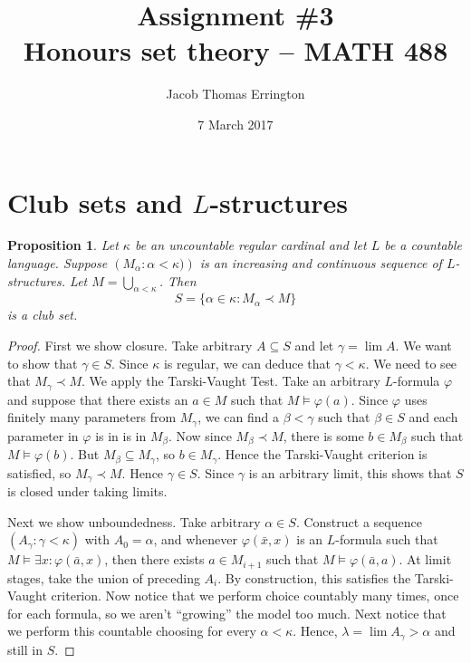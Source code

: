 \documentclass[11pt,letterpaper]{article}
\author{Jacob Thomas Errington}
\title{Assignment \#3 \\ Honours set theory -- MATH 488}
\date{7 March 2017}
\newtheorem{prop}{Proposition}
\newcommand{\parens}[1]{\left(#1\right)}
\newcommand{\Union}{\bigcup}
\newcommand{\question}{\section}
\renewcommand{\phi}{\varphi}
\begin{document}
\maketitle

\question{Club sets and $L$-structures}

\begin{prop}
    Let $\kappa$ be an uncountable regular cardinal and let $L$ be a countable
    language. Suppose $\parens{M_\alpha : \alpha < \kappa)}$ is an increasing
    and continuous sequence of $L$-structures.
    Let $M = \Union_{\alpha < \kappa}$.
    Then
    \begin{equation*}
        S = \{ \alpha \in \kappa : M_\alpha \prec M \}
    \end{equation*}
    is a club set.
\end{prop}

\begin{proof}
    First we show closure. Take arbitrary $A \subseteq S$ and let
    $\gamma = \lim A$. We want to show that $\gamma \in S$. Since $\kappa$ is
    regular, we can deduce that $\gamma < \kappa$. We need to see that
    $M_\gamma \prec M$. We apply the Tarski-Vaught Test. Take an arbitrary
    $L$-formula $\phi$ and suppose that there exists an $a \in M$ such that
    $M \models \phi(a)$. Since $\phi$ uses finitely many parameters from
    $M_\gamma$, we can find a $\beta < \gamma$ such that $\beta \in S$ and each
    parameter in $\phi$ is in is in $M_\beta$. Now since $M_\beta \prec M$,
    there is some $b \in M_\beta$ such that $M \models \phi(b)$. But
    $M_\beta \subseteq M_\gamma$, so $b \in M_\gamma$. Hence the Tarski-Vaught
    criterion is satisfied, so $M_\gamma \prec M$. Hence $\gamma \in S$. Since
    $\gamma$ is an arbitrary limit, this shows that $S$ is closed under taking
    limits.

    Next we show unboundedness. Take arbitrary $\alpha \in S$. Construct a
    sequence $(A_\gamma : \gamma < \kappa)$ with $A_0 = \alpha$, and whenever
    $\phi(\bar x, x)$ is an $L$-formula such that
    $M \models \exists x : \phi(\bar a, x)$,
    then there exists $a \in M_{i + 1}$
    such that $M \models \phi(\bar a , a)$.
    At limit stages, take the union of preceding $A_i$.
    By construction, this satisfies the Tarski-Vaught criterion.
    Now notice that we perform choice countably many times, once for each
    formula, so we aren't ``growing'' the model too much.
    Next notice that we perform this countable choosing
    for every $\alpha < \kappa$.
    Hence, $\lambda = \lim A_\gamma > \alpha$ and still in $S$.
\end{proof}
\end{document}

